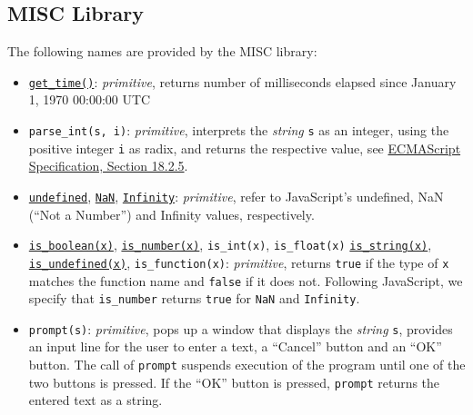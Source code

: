 \subsection*{MISC Library}


The following
names are provided by the MISC library:
\begin{itemize}
\item \href{https://sourceacademy.org/sicpjs/1.2.6\#ex_1.22}{\lstinline{get_time()}}: \textit{primitive}, returns number of milliseconds elapsed since January 1, 1970 00:00:00 UTC
\item \verb#parse_int#\texttt{(s, i)}: \textit{primitive}, 
interprets the \emph{string} \texttt{s} as an integer, using the positive integer \texttt{i} as radix, and returns the respective value,
see \href{https://www.ecma-international.org/ecma-262/9.0/index.html\#sec-parseint-string-radix}{\color{DarkBlue}ECMAScript Specification, Section 18.2.5}.
\item \href{https://sourceacademy.org/sicpjs/2.4.3\#p6}{\texttt{undefined}},
  \texttt{\href{https://www.ecma-international.org/ecma-262/9.0/index.html\#sec-value-properties-of-the-global-object-nan}{\color{DarkBlue}NaN}}, \texttt{\href{https://www.ecma-international.org/ecma-262/9.0/index.html\#sec-value-properties-of-the-global-object-infinity}{\color{DarkBlue}Infinity}}: \textit{primitive}, refer to JavaScript's undefined,
NaN (``Not a Number'') and Infinity values, respectively.
\item \href{https://sourceacademy.org/sicpjs/4.1.2\#p2}{\lstinline{is_boolean(x)}}, \href{https://sourceacademy.org/sicpjs/2.3.2\#p5}{\lstinline{is_number(x)}}, \verb#is_int#\texttt{(x)}, \verb#is_float#\texttt{(x)}
  \href{https://sourceacademy.org/sicpjs/2.3.2\#p7}{\lstinline{is_string(x)}}, \href{https://sourceacademy.org/sicpjs/4.1.2\#p2}{\lstinline{is_undefined(x)}}, \verb#is_function#\texttt{(x)}: \textit{primitive}, returns \texttt{true} if the type of \texttt{x} matches the function name and \texttt{false} if it does not. Following
        JavaScript, we specify that \verb#is_number# returns \texttt{true} for \texttt{NaN} and \texttt{Infinity}.
\item \texttt{prompt(s)}: \textit{primitive}, pops up a window that displays the \emph{string} \texttt{s}, provides
an input line for the user to enter a text, a ``Cancel'' button and an ``OK'' button. The call of \texttt{prompt}
suspends execution of the program until one of the two buttons is pressed. If 
the ``OK'' button is pressed, \texttt{prompt} returns the entered text as a string.

\end{itemize}

